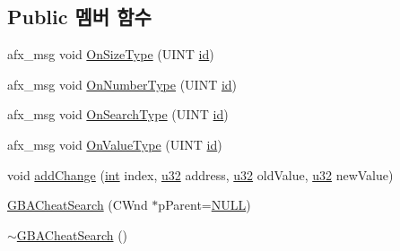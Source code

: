 \subsection*{Public 멤버 함수}
\begin{DoxyCompactItemize}
\item 
afx\+\_\+msg void \mbox{\hyperlink{class_g_b_a_cheat_search_a3a8aab04dae339242636eaa50b5c3bff}{On\+Size\+Type}} (U\+I\+NT \mbox{\hyperlink{_commands_8cpp_a7b7a6396b2c82ad46c6d8b2bf141a8dd}{id}})
\item 
afx\+\_\+msg void \mbox{\hyperlink{class_g_b_a_cheat_search_ad75552e2edb79b66761e42965221268c}{On\+Number\+Type}} (U\+I\+NT \mbox{\hyperlink{_commands_8cpp_a7b7a6396b2c82ad46c6d8b2bf141a8dd}{id}})
\item 
afx\+\_\+msg void \mbox{\hyperlink{class_g_b_a_cheat_search_a58e09cf82509ff9b68f35d3e3e780c0a}{On\+Search\+Type}} (U\+I\+NT \mbox{\hyperlink{_commands_8cpp_a7b7a6396b2c82ad46c6d8b2bf141a8dd}{id}})
\item 
afx\+\_\+msg void \mbox{\hyperlink{class_g_b_a_cheat_search_a6cafcf45420b6af926e47a70f0f9da02}{On\+Value\+Type}} (U\+I\+NT \mbox{\hyperlink{_commands_8cpp_a7b7a6396b2c82ad46c6d8b2bf141a8dd}{id}})
\item 
void \mbox{\hyperlink{class_g_b_a_cheat_search_afefabf8fcfe952b062d260152c595415}{add\+Change}} (\mbox{\hyperlink{_util_8cpp_a0ef32aa8672df19503a49fab2d0c8071}{int}} index, \mbox{\hyperlink{_system_8h_a10e94b422ef0c20dcdec20d31a1f5049}{u32}} address, \mbox{\hyperlink{_system_8h_a10e94b422ef0c20dcdec20d31a1f5049}{u32}} old\+Value, \mbox{\hyperlink{_system_8h_a10e94b422ef0c20dcdec20d31a1f5049}{u32}} new\+Value)
\item 
\mbox{\hyperlink{class_g_b_a_cheat_search_aa59bfbdaba09776ce59a01770bb4e756}{G\+B\+A\+Cheat\+Search}} (C\+Wnd $\ast$p\+Parent=\mbox{\hyperlink{_system_8h_a070d2ce7b6bb7e5c05602aa8c308d0c4}{N\+U\+LL}})
\item 
\mbox{\hyperlink{class_g_b_a_cheat_search_a3c856e36f9d3fae6e11d53705132e177}{$\sim$\+G\+B\+A\+Cheat\+Search}} ()
\end{DoxyCompactItemize}
